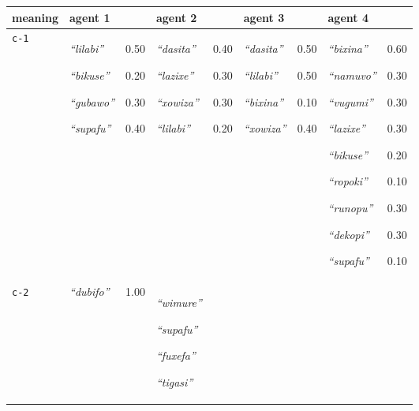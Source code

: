 
{\footnotesize\renewcommand{\arraystretch}{1.5}
\begin{tabular}{@{}p{1.2cm}|p{1.6cm}@{}p{0.8cm}@{}|p{1.6cm}@{}p{0.8cm}@{}|p{1.6cm}@{}p{0.8cm}@{}|p{1.6cm}@{}p{0.8cm}@{}}
meaning & agent 1 &  & agent 2 &  & agent 3 &  & agent 4 & \\
\hline
\texttt{c-1}&\textit{``lilabi''}


\textit{``bikuse''}


\textit{``gubawo''}


\textit{``supafu''}
&0.50

0.20

0.30

0.40&\textit{``dasita''}


\textit{``lazixe''}


\textit{``xowiza''}


\textit{``lilabi''}
&0.40

0.30

0.30

0.20&\textit{``dasita''}


\textit{``lilabi''}


\textit{``bixina''}


\textit{``xowiza''}
&0.50

0.50

0.10

0.40&\textit{``bixina''}


\textit{``namuvo''}


\textit{``vugumi''}


\textit{``lazixe''}


\textit{``bikuse''}


\textit{``ropoki''}


\textit{``runopu''}


\textit{``dekopi''}


\textit{``supafu''}
&0.60

0.30

0.30

0.30

0.20

0.10

0.30

0.30

0.10\\
\hline
\texttt{c-2}&\textit{``dubifo''}
&1.00&\textit{``wimure''}


\textit{``supafu''}


\textit{``fuxefa''}


\textit{``tigasi''}



\end{tabular}}
